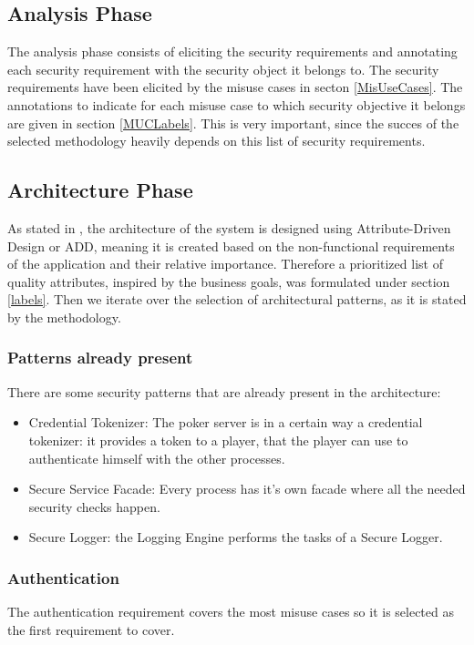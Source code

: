 \documentclass[a4paper,11pt]{report}
\begin{document}
\subsection{Analysis Phase}
The analysis phase consists of eliciting the security requirements and annotating each
security requirement with the security object it belongs to. The security requirements have been elicited by the misuse cases
in secton \ref{MisUseCases}. The annotations to indicate for each misuse case to which security objective it belongs
are given in section \ref{MUCLabels}. This is very important, since the succes of the selected methodology heavily depends
on this list of security requirements.


\subsection{Architecture Phase}
As stated in \cite[p13]{yskout}, the architecture of the system is designed using Attribute-Driven Design or ADD,
meaning it is created based on the non-functional requirements of the application and their relative importance.
Therefore a prioritized list of quality attributes, inspired by the business goals, was formulated under
section \ref{labels}. Then we iterate over the selection of architectural patterns, as it is stated by the methodology.

\subsubsection{Patterns already present}
\label{pres_patterns}
There are some security patterns that are already present in the architecture:
\begin{itemize}
\item Credential Tokenizer: The poker server is in a certain way a credential tokenizer: it provides a token to a
player, that the player can use to authenticate himself with the other processes.
\item Secure Service Facade: Every process has it's own facade where all the needed
security checks happen.
\item Secure Logger: the Logging Engine performs the tasks of a Secure Logger.
\end{itemize}

\subsubsection{Authentication}
\label{ArchitectureAuthentication}
The authentication requirement covers the most misuse cases so it is selected as the first requirement to cover.
\end{document}
